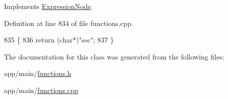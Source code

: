 Implements \hyperlink{classExpressionNode_a42a5e9562b0f645a19dcc83f698069b5}{Expression\+Node}.



Definition at line 834 of file functions.\+cpp.


\begin{DoxyCode}
835 \{
836     \textcolor{keywordflow}{return} (\textcolor{keywordtype}{char}*)\textcolor{stringliteral}{"sec"};
837 \}
\end{DoxyCode}


The documentation for this class was generated from the following files\+:\begin{DoxyCompactItemize}
\item 
app/main/\hyperlink{functions_8h}{functions.\+h}\item 
app/main/\hyperlink{functions_8cpp}{functions.\+cpp}\end{DoxyCompactItemize}
